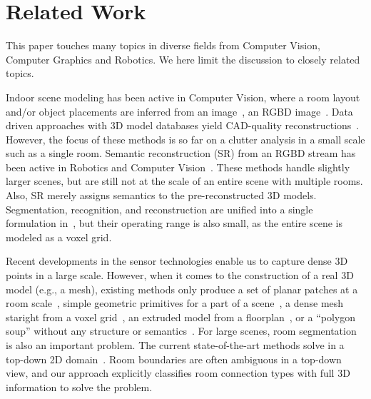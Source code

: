 \section{Related Work}
This paper touches many topics in diverse fields from Computer
Vision, Computer Graphics and Robotics.
We here limit the discussion to closely related topics.

Indoor scene modeling has been active in Computer Vision, where a room
layout and/or object placements are inferred from an
image~\cite{Hedau2009,fouhey2013data}, an RGBD
image~\cite{Hoiem13,cornel_indoor_13}. Data driven approaches
with 3D model databases yield CAD-quality
reconstructions~\cite{cad_matching_12,search_classify_12}. However, the
focus of these methods is so far on a clutter analysis in a small scale
such as a single room.
%
Semantic reconstruction (SR) from an RGBD stream has been active in
Robotics and Computer Vision~\cite{jia20133d,herbst2014toward}. These
methods handle slightly larger scenes, but are still not at the scale of
an entire scene with multiple rooms. Also, SR merely assigns semantics
to the pre-reconstructed 3D models. Segmentation, recognition, and
reconstruction are unified into a single formulation
in~\cite{hane2013joint}, but their operating range is also small, as the
entire scene is modeled as a voxel grid.

Recent developments in the sensor technologies enable us to capture
dense 3D points in a large scale.
However, when it comes to the construction of a real 3D model (e.g., a
mesh), existing methods only produce a set of planar patches at a room
scale~\cite{xiong2013automatic}, simple geometric
primitives for a part of a scene~\cite{mani_progress_monitoring}, a
dense mesh staright from a voxel grid~\cite{Turner2015}, an extruded
model from a floorplan~\cite{Turner2015}, or a ``polygon soup'' without
any structure or semantics~\cite{eccv_museum}.
%
%
For large scenes, room segmentation is also an important problem. The
current state-of-the-art methods solve in a top-down 2D
domain~\cite{Turner2015,Mura2014}. Room boundaries are often ambiguous in
a top-down view, and our approach explicitly classifies room connection
types with full 3D information to solve the problem.


